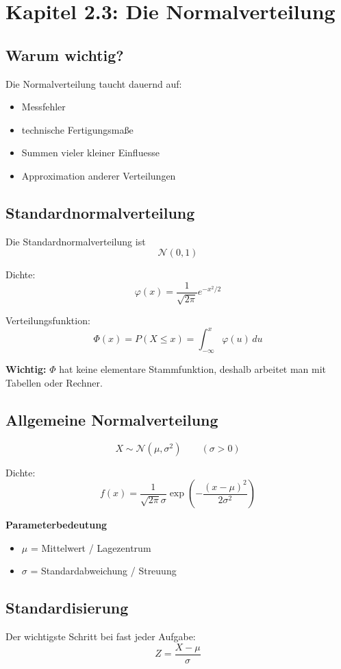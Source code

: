\documentclass[a4paper,11pt]{article}
\begin{document}
\section{Kapitel 2.3: Die Normalverteilung}

\subsection{Warum wichtig?}
Die Normalverteilung taucht dauernd auf:
\begin{itemize}
  \item Messfehler
  \item technische Fertigungsmaße
  \item Summen vieler kleiner Einfluesse
  \item Approximation anderer Verteilungen
\end{itemize}

\subsection{Standardnormalverteilung}
Die Standardnormalverteilung ist
\[
\mathcal N(0,1)
\]

Dichte:
\[
\varphi(x)=\frac{1}{\sqrt{2\pi}}e^{-x^2/2}
\]

Verteilungsfunktion:
\[
\Phi(x)=P(X\le x)=\int_{-\infty}^x \varphi(u)\,du
\]

\textbf{Wichtig:}
$\Phi$ hat keine elementare Stammfunktion, deshalb arbeitet man mit Tabellen oder Rechner.

\subsection{Allgemeine Normalverteilung}
\[
X\sim \mathcal N(\mu,\sigma^2)
\qquad (\sigma>0)
\]

Dichte:
\[
f(x)=\frac{1}{\sqrt{2\pi}\sigma}\exp\left(-\frac{(x-\mu)^2}{2\sigma^2}\right)
\]

\textbf{Parameterbedeutung}
\begin{itemize}
  \item $\mu$ = Mittelwert / Lagezentrum
  \item $\sigma$ = Standardabweichung / Streuung
\end{itemize}

\subsection{Standardisierung}
Der wichtigste Schritt bei fast jeder Aufgabe:
\[
Z=\frac{X-\mu}{\sigma}
\]
\end{document}
